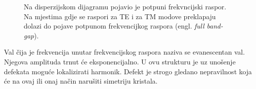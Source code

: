 \documentclass[utf8, seminar, numeric]{fer}
\begin{document}
\begin{figure}[ht]
\centering
    \qquad
	\caption{Na disperzijskom dijagramu pojavio je potpuni frekvncijski raspor. Na mjestima
	gdje se raspori za TE i za TM modove preklapaju dolazi do pojave potpunom frekvencijkog
	raspora (engl. \textit{full band-gap}).}
	\label{fig:triangular_lattice_holes}
\end{figure}

\FloatBarrier

Val čija je frekvencija unutar frekvencijskog raspora naziva se evanescentan val.
Njegova amplituda trnut će eksponencijalno. U ovu strukturu je uz unošenje
defekata moguće lokalizirati harmonik. Defekt je strogo gledano nepravilnost
koja će na ovaj ili onaj način narušiti simetriju kristala.
\end{document}
